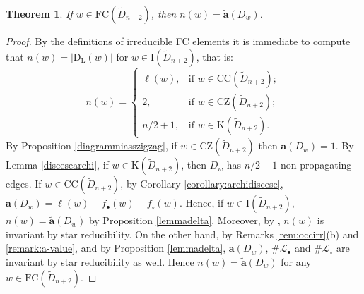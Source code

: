 \documentclass{amsart}
\newcommand{\D}{{\widetilde{D}_{n+2}}}
\newcommand{\ld}{{\mathrm{D}_{\mathrm{L}}}}
\newcommand{\fc}{{\mathrm{FC}}}
\newcommand{\bO}{{\mathcal{L}_{\bullet}}}
\newcommand{\wO}{{\mathcal{L}_{\circ}}}
\newcommand{\TTC}{\mathrm{CC}}
\newcommand{\zz}{\mathrm{CZ}}
\newcommand{\car}{\mathrm{K}}
\newcommand{\I}{\mathrm{I}}
\newcommand{\ab}{\mathbf{a}}
\newcommand{\at}{\widetilde{\mathbf{a}}}
\newtheorem{Theorem}{Theorem}[section]
\theoremstyle{definition}
\begin{document}
\begin{Theorem}\label{theorem:a-lusztig}
    If $w\in \fc(\D)$, then $n(w)=\at(D_w)$.
\end{Theorem}

\begin{proof}
    By the definitions of irreducible FC elements it is immediate to compute that $n(w)=|\ld(w)|$ for $w\in \I(\D)$, that is:
 $$n(w)=\begin{cases}
        \ell(w), &\mbox{if }w\in \TTC(\D);\\
        2, &\mbox{if }w\in \zz(\D);\\
        n/2 +1, &\mbox{if }w\in \car(\D).
    \end{cases}$$
     By Proposition \ref{diagrammiasszigzag}, if $w\in \zz(\D)$ then $\ab(D_w)=1$. By Lemma \ref{discesearchi}, if $w\in \car(\D)$, then $D_w$ has $n/2+1$ non-propagating edges. If $w\in \TTC(\D)$, by Corollary \ref{corollary:archidiscese}, $\ab(D_w)=\ell(w)-f_\bullet(w)-f_\circ(w)$. Hence, if $w\in \I(\D)$, $n(w)=\at(D_w)$ by Proposition \ref{lemmadelta}. Moreover, by \cite[Lemma 2.9]{shi_fully}, $n(w)$ is invariant by star reducibility. On the other hand, by Remarks \ref{rem:occirr}(b) and \ref{remark:a-value}, and by Proposition \ref{lemmadelta}, $\ab(D_w)$, $\# \bO$ and $\# \wO$ are invariant by star reducibility as well. 
     Hence $n(w)=\at(D_w)$ for any $w\in \fc(\D)$. 
\end{proof}


\end{document}
